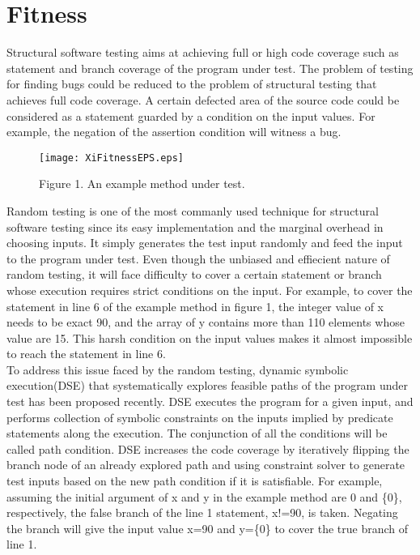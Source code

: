 \section{Fitness}
\indent Structural software testing aims at achieving full or high code coverage such as statement and branch coverage of the program under test. The problem of testing for finding bugs could be reduced to the problem of structural testing that achieves full code coverage. A certain defected area of the source code could be considered as a statement guarded by a condition on the input values. For example, the negation of the assertion condition will witness a bug.\\
\begin{figure}[b]
\centering
\texttt{[image: XiFitnessEPS.eps]}
\caption{Figure 1. An example method under test.}
\end{figure}
\indent Random testing is one of the most commanly used technique for structural software testing since its easy implementation and the marginal overhead in choosing inputs. It simply generates the test input randomly and feed the input to the program under test. Even though the unbiased and effiecient nature of random testing, it will face difficulty to cover a certain statement or branch whose execution requires strict conditions on the input. For example, to cover the statement in line 6 of the example method in figure 1, the integer value of x needs to be exact 90, and the array of y contains more than 110 elements whose value are 15. This harsh condition on the input values makes it almost impossible to reach the statement in line 6.\\
\indent To address this issue faced by the random testing, dynamic symbolic execution(DSE) that systematically explores feasible paths of the program under test has been proposed recently. DSE executes the program for a given input, and performs collection of symbolic constraints on the inputs implied by predicate statements along the execution. The conjunction of all the conditions will be called path condition. DSE increases the code coverage by iteratively flipping the branch node of an already explored path and using constraint solver to generate test inputs based on the new path condition if it is satisfiable. For example, assuming the initial argument of x and y in the example method are 0 and \{0\}, respectively, the false branch of the line 1 statement, x!=90, is taken. Negating the branch will give the input value x=90 and y=\{0\} to cover the true branch of line 1. \\
